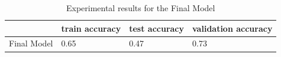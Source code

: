 \documentclass{article}
\begin{document}
\begin{table}[!ht]
    \centering    
    \caption{Experimental results for the Final Model}
    \label{table:final_results}
    \begin{tabular}{llll}
        \toprule
        \centering
        {} & train accuracy & test accuracy & validation accuracy \\
        \midrule
         Final Model & 0.65  & 0.47 & 0.73 \\
        \bottomrule
    \end{tabular}
\end{table}
\end{document}
